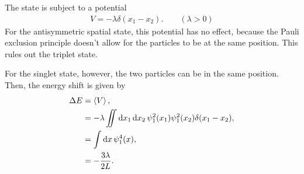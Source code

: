 \documentclass[
a4paper,
10pt,
twoside,
]{article}
\begin{document}
The state is subject to a potential
\begin{align}
	V = -\lambda \delta(x_1 - x_2). \qquad (\lambda > 0)
\end{align}
For the antisymmetric spatial state, this potential has no effect, because the Pauli exclusion principle doesn't allow for the particles to be at the same position.
This rules out the triplet state.

For the singlet state, however, the two particles can be in the same position.
Then, the energy shift is given by
\begin{align}
	\Delta E &= \ev{V},\\
		&= -\lambda \iint\dd{x_1}\dd{x_2} \psi_1^2(x_1)\psi_1^2(x_2)\delta(x_1-x_2),\\
		&= \int\dd{x} \psi_1^4(x),\\
		&= -\frac{3\lambda}{2L}.
\end{align}

\stopmcols
\end{document}

